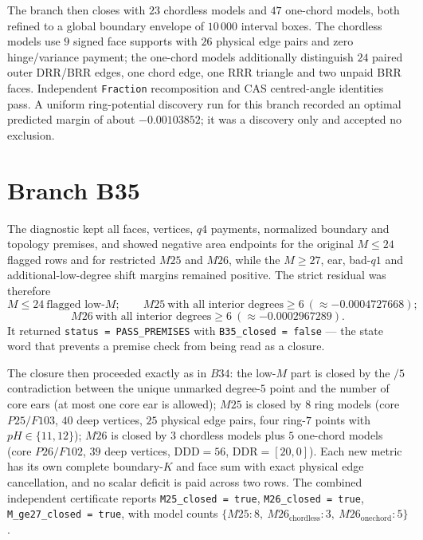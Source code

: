 The branch then closes with $23$ chordless models and $47$ one-chord models, both refined to a
global boundary envelope of $10\,000$ interval boxes. The chordless models use $9$ signed face
supports with $26$ physical edge pairs and zero hinge/variance payment; the one-chord models
additionally distinguish $24$ paired outer DRR/BRR edges, one chord edge, one RRR triangle and two
unpaid BRR faces. Independent \texttt{Fraction} recomposition and CAS centred-angle identities pass.
A uniform ring-potential discovery run for this branch recorded an optimal predicted margin of about
$-0.00103852$; it was a discovery only and accepted no exclusion.

\section{Branch B35}

The diagnostic kept all faces, vertices, $q4$ payments, normalized boundary and topology premises,
and showed negative area endpoints for the original $M\le24$ flagged rows and for restricted $M25$
and $M26$, while the $M\ge27$, ear, bad-$q1$ and additional-low-degree shift margins remained
positive. The strict residual was therefore
\[
M\le24\ \text{flagged low-}M;\qquad M25\ \text{with all interior degrees}\ge6\ (\approx-0.0004727668);
\]
\[
M26\ \text{with all interior degrees}\ge6\ (\approx-0.0002967289).
\]
It returned \texttt{status = PASS\_\allowbreak{}PREMISES} with \texttt{B35\_\allowbreak{}closed = false} --- the state word
that prevents a premise check from being read as a closure.

The closure then proceeded exactly as in $B34$: the low-$M$ part is closed by the $/5$ contradiction
between the unique unmarked degree-$5$ point and the number of core ears (at most one core ear is
allowed); $M25$ is closed by $8$ ring models (core $P25/F103$, $40$ deep vertices, $25$ physical edge
pairs, four ring-$7$ points with $pH\in\{11,12\}$); $M26$ is closed by $3$ chordless models plus $5$
one-chord models (core $P26/F102$, $39$ deep vertices, $\mathrm{DDD}=56$,
$\mathrm{DDR}=[20,0]$). Each new metric has its own complete boundary-$K$ and face sum with exact
physical edge cancellation, and no scalar deficit is paid across two rows. The combined independent
certificate reports \texttt{M25\_\allowbreak{}closed = true}, \texttt{M26\_\allowbreak{}closed = true},
\texttt{M\_\allowbreak{}ge27\_\allowbreak{}closed = true}, with model counts $\{M25:8,\ M26_{\text{chordless}}:3,\
M26_{\text{onechord}}:5\}$.

